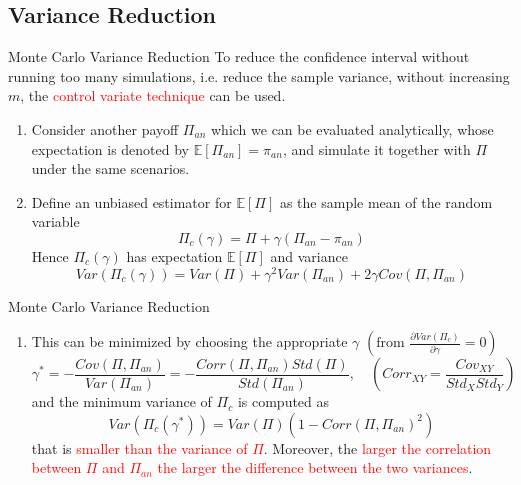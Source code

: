 \documentclass{beamer}
\begin{document}
\subsection{Variance Reduction}
\begin{frame}{Monte Carlo Variance Reduction}
  To reduce the confidence interval without running too many simulations, i.e. reduce the sample variance, without increasing $m$, the \textcolor{red}{control variate technique} can be used.
  \pause
  \begin{enumerate}
  \item<2-> Consider another payoff $\Pi_{an}$ which we can be evaluated analytically, whose expectation is denoted by $\mathbb{E}[\Pi_{an}] = \pi_{an}$, and simulate it together with $\Pi$ under the same scenarios.%
  \item<3-> Define an unbiased estimator for $\mathbb{E}[\Pi]$ as the sample mean of the random variable 
    \begin{equation*}
      \Pi_c(\gamma) = \Pi + \gamma(\Pi_{an} - \pi_{an})
    \end{equation*}
    Hence $\Pi_c(\gamma)$ has expectation $\mathbb{E}[\Pi]$ and variance
    \begin{equation*}
      Var(\Pi_c(\gamma)) = Var(\Pi) + \gamma^2 Var(\Pi_{an}) + 2\gamma Cov(\Pi, \Pi_{an})
    \end{equation*}
  \end{enumerate}
\end{frame}

\begin{frame}{Monte Carlo Variance Reduction}
	\begin{enumerate}\addtocounter{enumi}{2}
	\item This can be minimized by choosing the appropriate $\gamma$ $\left(\text{from }\frac{\partial Var(\Pi_c)}{\partial\gamma}=0\right)$
	\begin{equation*}
	\gamma^* = -\frac{Cov(\Pi, \Pi_{an})}{Var(\Pi_{an})} = -\frac{Corr(\Pi, \Pi_{an})Std(\Pi)}{Std(\Pi_{an})}, \quad \left(Corr_{XY}=\frac{Cov_{XY}}{Std_X Std_Y}\right)
	\end{equation*}
  	and the minimum variance of $\Pi_c$ is computed as
    \begin{equation*}
     Var(\Pi_c(\gamma^*)) = Var(\Pi)(1 - Corr(\Pi, \Pi_{an})^2)
    \end{equation*}
    that is \textcolor{red}{smaller than the variance of $\Pi$}. Moreover, the \textcolor{red}{larger the correlation between $\Pi$ and $\Pi_{an}$ the larger the difference between the two variances}.
  \end{enumerate}
\end{frame}
\end{document}
